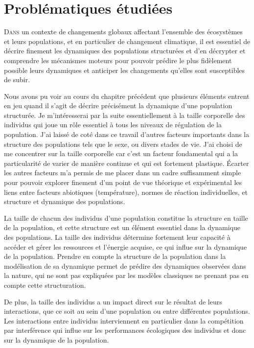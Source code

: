 \chapter{Problématiques étudiées}

\lettrine[lines=3]{D}{ans} un contexte de changements globaux affectant
l'ensemble des écosystèmes et leurs populations, et en particulier de changement
climatique, il est essentiel de décrire finement les dynamiques des populations
structurées et d’en décrypter et comprendre les mécanismes moteurs pour pouvoir
prédire le plus fidèlement possible leurs dynamiques et anticiper les
changements qu'elles sont susceptibles de subir.

Nous avons pu voir au cours du chapitre précédent que plusieurs éléments entrent
en jeu quand il s'agit de décrire précisément la dynamique d'une population
structurée. Je m’intéresserai par la suite essentiellement à la taille
corporelle des individus qui joue un rôle essentiel à tous les niveaux de
régulation de la population.
J’ai laissé de coté dans ce travail d’autres facteurs importants dans la
structure des populations tels que le sexe, ou divers stades de vie. J’ai choisi
de me concentrer sur la taille corporelle car c’est un facteur fondamental qui a
la particularité de varier de manière continue et qui est fortement plastique.
Écarter les autres facteurs m’a permis de me placer dans un cadre suffisamment
simple pour pouvoir explorer finement d’un point de vue théorique et
expérimental les liens entre facteurs abiotiques (température), normes de
réaction individuelles, et structure et dynamique des populations.

La taille de chacun des individus d'une population constitue la
structure en taille de la population, et cette structure est un élément
essentiel dans la dynamique des populations. La taille des individus détermine
fortement leur capacité à accéder et gérer les ressources et l'énergie acquise,
ce qui influe sur la dynamique de la population. Prendre en compte la structure
de la population dans la modélisation de sa dynamique permet de prédire des
dynamiques observées dans la nature, qui ne sont pas expliquées par les modèles
classiques ne prenant pas en compte cette structuration.

De plus, la taille des individus a un impact direct sur le résultat de leurs
interactions, que ce soit au sein d'une population ou entre différentes
populations. Les interactions entre individus interviennent en particulier dans
la compétition par interférence qui influe sur les performances écologiques des
individus et donc sur la dynamique de la population. 

